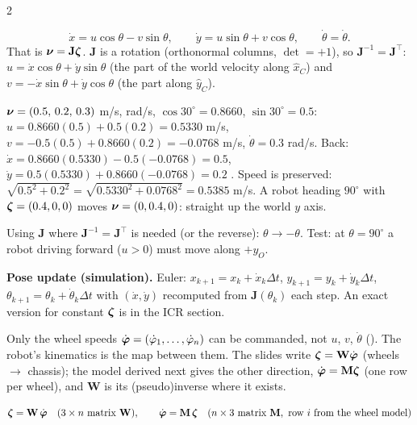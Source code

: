 \begin{multicols}{2}
\begin{deriv}
\[\dot x=u\cos\theta-v\sin\theta,\qquad \dot y=u\sin\theta+v\cos\theta,\qquad\dot\theta=\dot\theta.\]
That is $\boldsymbol\nu=\mathbf J\boldsymbol\zeta$. $\mathbf J$ is a rotation (orthonormal columns, $\det=+1$), so $\mathbf J^{-1}=\mathbf J^\top$: $u=\dot x\cos\theta+\dot y\sin\theta$ (the part of the world velocity along $\hat x_C$) and $v=-\dot x\sin\theta+\dot y\cos\theta$ (the part along $\hat y_C$).
\end{deriv}
\begin{worked}[world $\leftrightarrow$ chassis, $\theta=30^\circ$ \added]
$\boldsymbol\nu=(0.5,\,0.2,\,0.3)$ m/s, rad/s, $\cos30^\circ=0.8660$, $\sin30^\circ=0.5$:
$u=0.8660(0.5)+0.5(0.2)=\mathbf{0.5330}$ m/s, $v=-0.5(0.5)+0.8660(0.2)=\mathbf{-0.0768}$ m/s, $\dot\theta=0.3$ rad/s.
Back: $\dot x=0.8660(0.5330)-0.5(-0.0768)=0.5$, $\dot y=0.5(0.5330)+0.8660(-0.0768)=0.2$ \checkmark. Speed is preserved: $\sqrt{0.5^2+0.2^2}=\sqrt{0.5330^2+0.0768^2}=0.5385$ m/s. A robot heading $90^\circ$ with $\boldsymbol\zeta=(0.4,0,0)$ moves $\boldsymbol\nu=(0,0.4,0)$: straight up the world $y$ axis. \chk
\end{worked}
\begin{trap}
Using $\mathbf J$ where $\mathbf J^{-1}=\mathbf J^\top$ is needed (or the reverse): $\theta\to-\theta$. Test: at $\theta=90^\circ$ a robot driving forward ($u>0$) must move along $+y_O$.
\end{trap}
\textbf{Pose update (simulation).} Euler: $x_{k+1}=x_k+\dot x_k\Delta t$, $y_{k+1}=y_k+\dot y_k\Delta t$, $\theta_{k+1}=\theta_k+\dot\theta_k\Delta t$ with $(\dot x,\dot y)$ recomputed from $\mathbf J(\theta_k)$ each step. An exact version for constant $\boldsymbol\zeta$ is in the ICR section.

Only the wheel speeds $\dot{\boldsymbol\varphi}=(\dot\varphi_1,\dots,\dot\varphi_n)$ can be commanded, not $u$, $v$, $\dot\theta$ (). The robot's kinematics is the map between them. The slides write $\boldsymbol\zeta=\mathbf W\dot{\boldsymbol\varphi}$ (wheels $\to$ chassis); the model derived next gives the other direction, $\dot{\boldsymbol\varphi}=\mathbf M\boldsymbol\zeta$ (one row per wheel), and $\mathbf W$ is its (pseudo)inverse where it exists.
\begin{fbx}
\[\wXz=\mathbf W\,\wXp\quad(3\times n\ \text{matrix }\mathbf W),\qquad\wXp=\mathbf M\,\wXz\quad(n\times3\ \text{matrix }\mathbf M,\ \text{row }i\ \text{from the wheel model})\]
\end{fbx}


\end{multicols}
